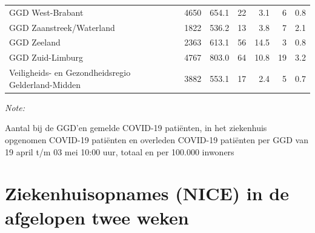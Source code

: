 \documentclass[
  english,
  man,floatsintext]{apa6}
\begin{document}
\begin{table}
\begin{threeparttable}
\begin{tabular}{lrrrrrr}
GGD West-Brabant & 4650 & 654.1 & 22 & 3.1 & 6 & 0.8\\
GGD Zaanstreek/Waterland & 1822 & 536.2 & 13 & 3.8 & 7 & 2.1\\
GGD Zeeland & 2363 & 613.1 & 56 & 14.5 & 3 & 0.8\\
GGD Zuid-Limburg & 4767 & 803.0 & 64 & 10.8 & 19 & 3.2\\
Veiligheids- en Gezondheidsregio Gelderland-Midden & 3882 & 553.1 & 17 & 2.4 & 5 & 0.7\\
\bottomrule
\end{tabular}
\begin{tablenotes}
\item \textit{Note: } 
\item Aantal bij de GGD’en gemelde COVID-19 patiënten, in het ziekenhuis opgenomen COVID-19 patiënten en overleden COVID-19 patiënten per GGD van 19 april t/m 03 mei 10:00 uur, totaal en per 100.000 inwoners
\end{tablenotes}
\end{threeparttable}
\endgroup{}
\end{table}

\newpage

\hypertarget{ziekenhuisopnames-nice-in-de-afgelopen-twee-weken}{%
\section{Ziekenhuisopnames (NICE) in de afgelopen twee weken}\label{ziekenhuisopnames-nice-in-de-afgelopen-twee-weken}}
\end{document}
